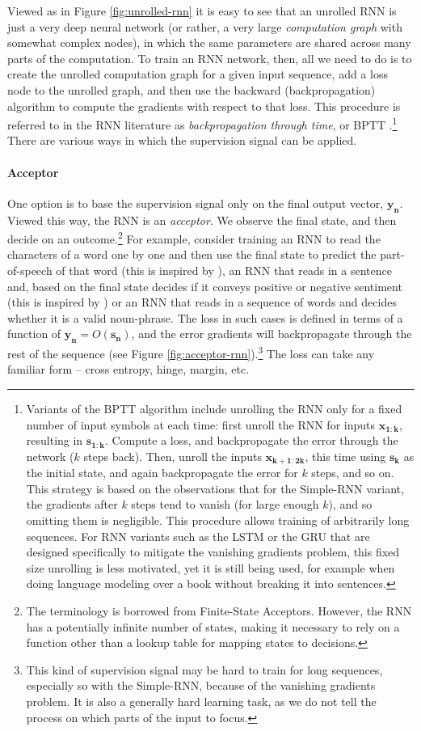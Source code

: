 \documentclass[jair,twoside,11pt,theapa]{article}
\newcommand{\m}[1]{\mathbf{#1}}%
\begin{document}
{Viewed as in Figure \ref{fig:unrolled-rnn} it is easy to see that an unrolled RNN is just a
very deep neural network (or rather, a very large \emph{computation graph} with
somewhat complex nodes), in which the same parameters are shared across many
parts of the computation. To train an RNN network, then, all we need to do is to
create the unrolled computation graph for a given input sequence, add a loss
node to the unrolled graph, and then use the backward (backpropagation)
algorithm to compute the gradients with respect to that loss. This procedure is
referred to in the RNN literature as \emph{backpropagation through time}, or
BPTT \cite{werbos1990backpropagation}.\footnote{Variants of the BPTT algorithm include unrolling the RNN
only for a fixed number of input symbols at each time: first unroll the RNN for
inputs $\m{x_{1:k}}$, resulting in $\m{s_{1:k}}$. Compute a loss, and
backpropagate the error through the network ($k$ steps back). Then, unroll the
inputs $\m{x_{k+1:2k}}$, this time using $\m{s_{k}}$ as the initial state, and
again backpropagate the error for $k$ steps, and so on. This strategy is based
on the observations that for the Simple-RNN variant, the gradients after $k$
steps tend to vanish (for large enough $k$), and so omitting them is negligible.
This procedure allows training of arbitrarily long sequences. For RNN variants
such as the LSTM or the GRU that are designed specifically to mitigate the
vanishing gradients problem, this fixed size unrolling is less motivated,
yet it is still being used, for example when doing language modeling over a book
without breaking it into sentences.} There are various ways in which the
supervision signal can be applied.

\paragraph{Acceptor} One option is to base the supervision signal only on the
final output vector, $\m{y_n}$. Viewed this way, the RNN is an
\emph{acceptor}.
We observe the final state, and then decide on an outcome.\footnote{The terminology is borrowed from Finite-State
Acceptors. However, the RNN has a potentially infinite number of states, making
it necessary to rely on a function other than a lookup table for mapping states to
decisions.}
For example, consider training an RNN to read the characters of a word one by
one and then use the final state to predict the part-of-speech of that word
(this is inspired by \cite{ling2015finding}), an RNN that reads in a sentence and,
based on the final state decides if it conveys positive or negative sentiment
(this is inspired by \cite{wang2015predicting}) or an RNN that reads in a sequence of words
and decides whether it is a valid noun-phrase.
The loss in such cases is defined in terms of a function of $\m{y_n} = O(\m{s_n})$, and the
error gradients will backpropagate through the rest of the
sequence (see Figure \ref{fig:acceptor-rnn}).\footnote{This kind of supervision signal may be hard to train for long
sequences, especially so with the Simple-RNN, because of the vanishing gradients problem.
It is also a generally hard learning task, as we do not tell the process on which parts of the input to focus.}
The loss can take any familiar form -- cross entropy, hinge, margin, etc.

}
\end{document}
